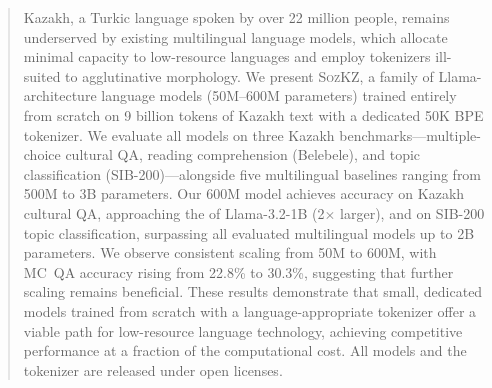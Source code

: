 \begin{abstract}
Kazakh, a Turkic language spoken by over 22 million people, remains
underserved by existing multilingual language models, which allocate
minimal capacity to low-resource languages and employ tokenizers
ill-suited to agglutinative morphology.  We present \textsc{SozKZ}, a
family of Llama-architecture language models (50M--600M parameters)
trained entirely from scratch on 9 billion tokens of Kazakh text with
a dedicated 50K BPE tokenizer.  We evaluate all models on three Kazakh
benchmarks---multiple-choice cultural QA, reading comprehension
(Belebele), and topic classification (SIB-200)---alongside five
multilingual baselines ranging from 500M to 3B parameters.  Our 600M
model achieves \accMcQaSozKZSixHundredM{} accuracy on Kazakh cultural
QA, approaching the \accMcQaLlamaThreeOneB{} of Llama-3.2-1B
(2$\times$ larger), and \accSibTwoHundredSozKZSixHundredM{} on
SIB-200 topic classification, surpassing all evaluated multilingual
models up to 2B parameters.  We observe consistent scaling from 50M to
600M, with MC~QA accuracy rising from 22.8\% to 30.3\%, suggesting
that further scaling remains beneficial.  These results demonstrate
that small, dedicated models trained from scratch with a
language-appropriate tokenizer offer a viable path for low-resource
language technology, achieving competitive performance at a fraction
of the computational cost.  All models and the tokenizer are released
under open licenses.
\end{abstract}

